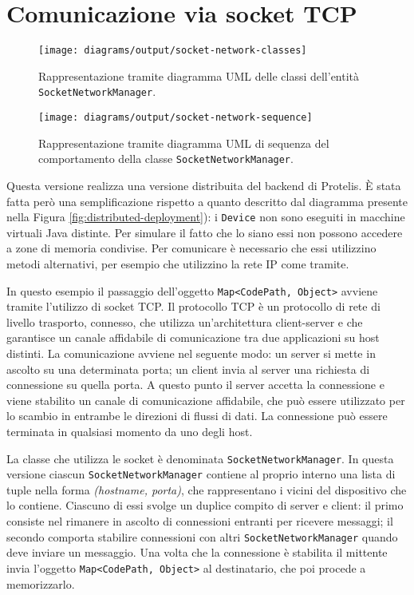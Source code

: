 \section{Comunicazione via socket TCP}
\begin{figure}
  \centering
  \texttt{[image: diagrams/output/socket-network-classes]}
  \caption{Rappresentazione tramite diagramma UML delle classi dell'entità
    \texttt{SocketNetworkManager}.}
  \label{fig:socket-network-classes}
\end{figure}
\begin{figure}
  \centering
  \texttt{[image: diagrams/output/socket-network-sequence]}
  \caption{Rappresentazione tramite diagramma UML di sequenza del comportamento
    della classe \texttt{SocketNetworkManager}.}
  \label{fig:socket-network-sequence}
\end{figure}
Questa versione realizza una versione distribuita del backend di Protelis.  È
stata fatta però una semplificazione rispetto a quanto descritto dal diagramma
presente nella Figura \ref{fig:distributed-deployment}): i \texttt{Device} non
sono eseguiti in macchine virtuali Java distinte. Per simulare il fatto che lo
siano essi non possono accedere a zone di memoria condivise. Per comunicare è
necessario che essi utilizzino metodi alternativi, per esempio che utilizzino la
rete IP come tramite.

In questo esempio il passaggio dell'oggetto \texttt{Map<CodePath, Object>}
avviene tramite l'utilizzo di socket TCP. Il protocollo TCP\cite{Postel1981} è
un protocollo di rete di livello trasporto, connesso, che utilizza
un'architettura client-server e che garantisce un canale affidabile di
comunicazione tra due applicazioni su host distinti. La comunicazione avviene
nel seguente modo: un server si mette in ascolto su una determinata porta; un
client invia al server una richiesta di connessione su quella porta. A questo
punto il server accetta la connessione e viene stabilito un canale di
comunicazione affidabile, che può essere utilizzato per lo scambio in entrambe
le direzioni di flussi di dati. La connessione può essere terminata in qualsiasi
momento da uno degli host.

La classe che utilizza le socket è denominata \texttt{SocketNetworkManager}. In
questa versione ciascun \texttt{SocketNetworkManager} contiene al proprio
interno una lista di tuple nella forma \textit{(hostname, porta)}, che
rappresentano i vicini del dispositivo che lo contiene. Ciascuno di essi svolge
un duplice compito di server e client: il primo consiste nel rimanere in ascolto
di connessioni entranti per ricevere messaggi; il secondo comporta stabilire
connessioni con altri \texttt{SocketNetworkManager} quando deve inviare un
messaggio. Una volta che la connessione è stabilita il mittente invia l'oggetto
\texttt{Map<CodePath, Object>} al destinatario, che poi procede a memorizzarlo.

